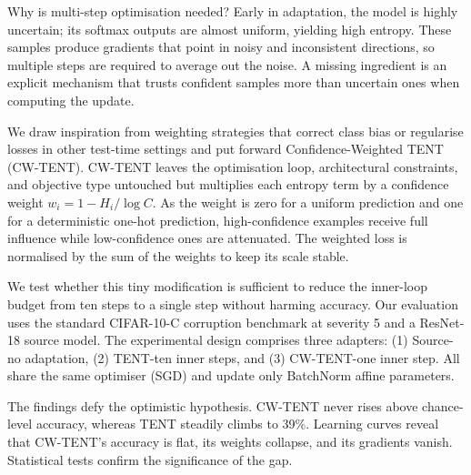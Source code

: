 \documentclass{article} %
\begin{document}
Why is multi-step optimisation needed? Early in adaptation, the model is highly uncertain; its softmax outputs are almost uniform, yielding high entropy. These samples produce gradients that point in noisy and inconsistent directions, so multiple steps are required to average out the noise. A missing ingredient is an explicit mechanism that trusts confident samples more than uncertain ones when computing the update.

We draw inspiration from weighting strategies that correct class bias or regularise losses in other test-time settings \cite{author-year-test,zhao-2023-delta} and put forward Confidence-Weighted TENT (CW-TENT). CW-TENT leaves the optimisation loop, architectural constraints, and objective type untouched but multiplies each entropy term by a confidence weight \(w_i = 1 - H_i/\log C\). As the weight is zero for a uniform prediction and one for a deterministic one-hot prediction, high-confidence examples receive full influence while low-confidence ones are attenuated. The weighted loss is normalised by the sum of the weights to keep its scale stable.

We test whether this tiny modification is sufficient to reduce the inner-loop budget from ten steps to a single step without harming accuracy. Our evaluation uses the standard CIFAR-10-C corruption benchmark at severity 5 and a ResNet-18 source model. The experimental design comprises three adapters: (1) Source-no adaptation, (2) TENT-ten inner steps, and (3) CW-TENT-one inner step. All share the same optimiser (SGD) and update only BatchNorm affine parameters.

The findings defy the optimistic hypothesis. CW-TENT never rises above chance-level accuracy, whereas TENT steadily climbs to 39\%. Learning curves reveal that CW-TENT's accuracy is flat, its weights collapse, and its gradients vanish. Statistical tests confirm the significance of the gap.
\end{document}
